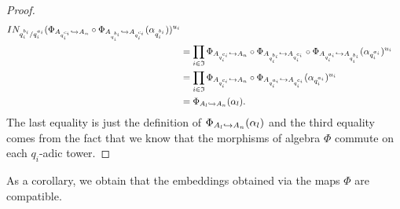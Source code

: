 \documentclass[a4paper,11pt]{article}
\begin{document}
\begin{proof}
\begin{align*}
{  I}N_{q_i^{b_i}/q_i^{a_i}}(\Phi_{A_{q_i^{c_i}}\hookrightarrow
A_n}\circ\Phi_{A_{q_i^{b_i}}\hookrightarrow A_{q_i^{c_i}}}
  (\alpha_{q_i^{b_i}}))^{u_i}\\
&= \prod_{i\in\mathfrak I}\Phi_{A_{q_i^{c_i}}\hookrightarrow
A_n}\circ\Phi_{A_{q_i^{b_i}}\hookrightarrow A_{q_i^{c_i}}}\circ\Phi_{A_{q_i^{a_i}}\hookrightarrow
A_{q_i^{b_i}}}(\alpha_{q_i^{a_i}})^{u_i}\\
&= \prod_{i\in\mathfrak I}\Phi_{A_{q_i^{c_i}}\hookrightarrow
A_n}\circ\Phi_{A_{q_i^{a_i}}\hookrightarrow A_{q_i^{c_i}}}(\alpha_{q_i^{a_i}})^{u_i}\\
&= \Phi_{A_l\hookrightarrow A_n}(\alpha_l).
  \end{align*}
  The last equality is just the definition of $\Phi_{A_l\hookrightarrow A_n}(\alpha_l)$ and
  the third equality comes from the fact that we know that the morphisms of algebra
  $\Phi$ commute on each $q_i$-adic tower.
\end{proof}
As a corollary, we obtain that the embeddings obtained via the maps $\Phi$ are
compatible.
\end{document}

